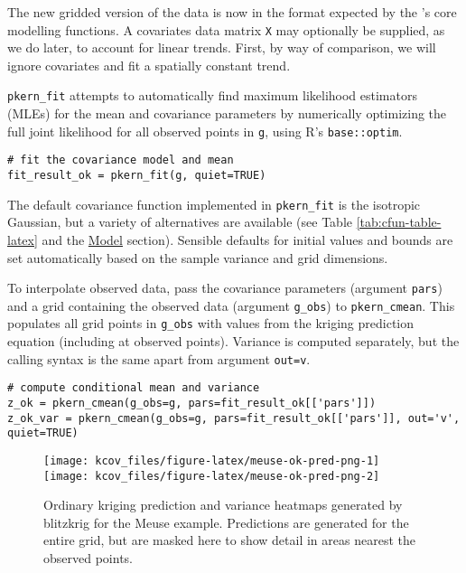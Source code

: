 The new gridded version of the data is now in the format expected by the 's core modelling functions. A covariates data matrix \texttt{X} may optionally be supplied, as we do later, to account for linear trends. First, by way of comparison, we will ignore covariates and fit a spatially constant trend.

\texttt{pkern\_fit} attempts to automatically find maximum likelihood estimators (MLEs) for the mean and covariance parameters by numerically optimizing the full joint likelihood for all observed points in \texttt{g}, using R's \texttt{base::optim}.

\begin{verbatim}
# fit the covariance model and mean
fit_result_ok = pkern_fit(g, quiet=TRUE)
\end{verbatim}

The default covariance function implemented in \texttt{pkern\_fit} is the isotropic Gaussian, but a variety of alternatives are available
(see Table \ref{tab:cfun-table-latex} and the \protect\hyperlink{model}{Model} section). Sensible defaults for initial values and bounds are set automatically based on the sample variance and grid dimensions.

To interpolate observed data, pass the covariance parameters (argument \texttt{pars}) and a grid containing the observed data (argument \texttt{g\_obs}) to \texttt{pkern\_cmean}. This populates all grid points in \texttt{g\_obs} with values from the kriging prediction equation (including at observed points). Variance is computed separately, but the calling syntax is the same apart from argument \texttt{out=\textquotesingle{}v\textquotesingle{}}.

\begin{verbatim}
# compute conditional mean and variance 
z_ok = pkern_cmean(g_obs=g, pars=fit_result_ok[['pars']])
z_ok_var = pkern_cmean(g_obs=g, pars=fit_result_ok[['pars']], out='v', quiet=TRUE)
\end{verbatim}

\begin{figure}
\texttt{[image: kcov\_files/figure-latex/meuse-ok-pred-png-1]} \texttt{[image: kcov\_files/figure-latex/meuse-ok-pred-png-2]} \caption{Ordinary kriging prediction and variance heatmaps generated by blitzkrig for the Meuse example. Predictions are generated for the entire grid, but are masked here to show detail in areas nearest the observed points.}\label{fig:meuse-ok-pred-png}
\end{figure}

